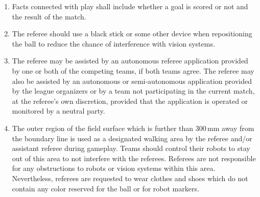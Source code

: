 \begin{enumerate}
\item
Facts connected with play shall include whether a goal is scored or not and the result of the match.

\item
The referee should use a black stick or some other device when repositioning the ball to reduce the chance of interference with vision systems.

\item
The referee may be assisted by an autonomous referee application provided by
one or both of the competing teams, if both teams agree. The referee may
also be assisted by an autonomous or semi-autonomous application provided
by the league organizers or by a team not participating in the current
match, at the referee's own discretion, provided that the application is
operated or monitored by a neutral party.

\item
The outer region of the field surface which is further than 300\,mm away from
the boundary line is used as a designated walking area by the referee and/or
assistant referee during gameplay.
Teams should control their robots to stay out of this area to not interfere with the referees.
Referees are not responsible for any obstructions to robots or vision systems within this area.
Nevertheless, referees are requested to wear clothes and shoes which do not contain any color reserved for the ball or for robot markers.

\end{enumerate}
